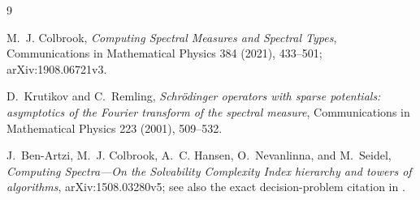 \documentclass[11pt]{article}
\theoremstyle{remark}
\begin{document}
\begin{thebibliography}{9}

M.~J. Colbrook,
\emph{Computing Spectral Measures and Spectral Types},
Communications in Mathematical Physics 384 (2021), 433--501;
arXiv:1908.06721v3.

D.~Krutikov and C.~Remling,
\emph{Schr\"odinger operators with sparse potentials: asymptotics of the
Fourier transform of the spectral measure},
Communications in Mathematical Physics 223 (2001), 509--532.

J.~Ben-Artzi, M.~J. Colbrook, A.~C. Hansen, O.~Nevanlinna, and M.~Seidel,
\emph{Computing Spectra---On the Solvability Complexity Index hierarchy and
towers of algorithms},
arXiv:1508.03280v5; see also the exact decision-problem citation in
\cite{Colbrook}.

\end{thebibliography}
\end{document}

